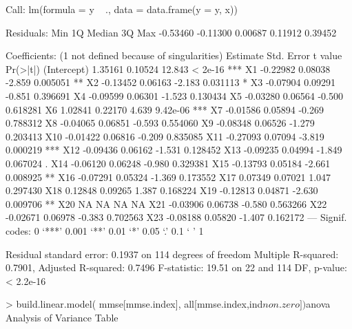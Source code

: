 Call:
lm(formula = y ~ ., data = data.frame(y = y, x))

Residuals:
     Min       1Q   Median       3Q      Max 
-0.53460 -0.11300  0.00687  0.11912  0.39452 

Coefficients: (1 not defined because of singularities)
            Estimate Std. Error t value Pr(>|t|)    
(Intercept)  1.35161    0.10524  12.843  < 2e-16 ***
X1          -0.22982    0.08038  -2.859 0.005051 ** 
X2          -0.13452    0.06163  -2.183 0.031113 *  
X3          -0.07904    0.09291  -0.851 0.396691    
X4          -0.09599    0.06301  -1.523 0.130434    
X5          -0.03280    0.06564  -0.500 0.618281    
X6           1.02841    0.22170   4.639 9.42e-06 ***
X7          -0.01586    0.05894  -0.269 0.788312    
X8          -0.04065    0.06851  -0.593 0.554060    
X9          -0.08348    0.06526  -1.279 0.203413    
X10         -0.01422    0.06816  -0.209 0.835085    
X11         -0.27093    0.07094  -3.819 0.000219 ***
X12         -0.09436    0.06162  -1.531 0.128452    
X13         -0.09235    0.04994  -1.849 0.067024 .  
X14         -0.06120    0.06248  -0.980 0.329381    
X15         -0.13793    0.05184  -2.661 0.008925 ** 
X16         -0.07291    0.05324  -1.369 0.173552    
X17          0.07349    0.07021   1.047 0.297430    
X18          0.12848    0.09265   1.387 0.168224    
X19         -0.12813    0.04871  -2.630 0.009706 ** 
X20               NA         NA      NA       NA    
X21         -0.03906    0.06738  -0.580 0.563266    
X22         -0.02671    0.06978  -0.383 0.702563    
X23         -0.08188    0.05820  -1.407 0.162172    
---
Signif. codes:  0 ‘***’ 0.001 ‘**’ 0.01 ‘*’ 0.05 ‘.’ 0.1 ‘ ’ 1

Residual standard error: 0.1937 on 114 degrees of freedom
Multiple R-squared:  0.7901,	Adjusted R-squared:  0.7496 
F-statistic: 19.51 on 22 and 114 DF,  p-value: < 2.2e-16






> build.linear.model( mmse[mmse.index], all[mmse.index,ind$non.zero])$anova
Analysis of Variance Table

